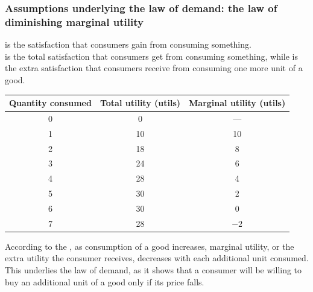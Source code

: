 \subsubsection*{Assumptions underlying the law of demand: the law of diminishing marginal utility}
 is the satisfaction that consumers gain from consuming something. \\
 is the total satisfaction that consumers get from consuming something, while  is the extra satisfaction that consumers receive from consuming one more unit of a good.
\begin{center}
\begin{tabular}{c|c|c}
\toprule
\textbf{Quantity consumed} & \textbf{Total utility (utils)} & \textbf{Marginal utility (utils)} \\
\midrule
0 & 0 & --- \\
1 & 10 & 10 \\
2 & 18 & 8 \\
3 & 24 & 6 \\
4 & 28 & 4 \\
5 & 30 & 2 \\
6 & 30 & 0 \\
7 & 28 & $-2$ \\
\bottomrule
\end{tabular}
\end{center}
According to the , as consumption of a good increases, marginal utility, or the extra utility the consumer receives, decreases with each additional unit consumed. This underlies the law of demand, as it shows that a consumer will be willing to buy an additional unit of a good only if its price falls.
